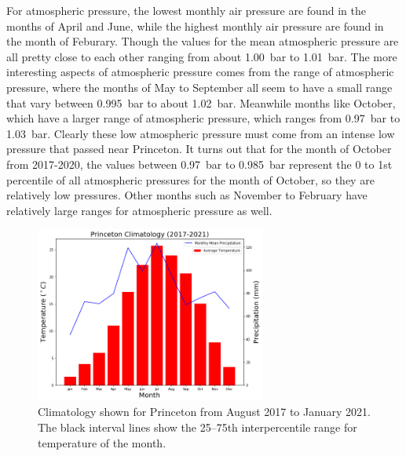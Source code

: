 \documentclass[11pt]{report}
\begin{document}
For atmospheric pressure, the lowest monthly air pressure are found in the
months of April and June, while the highest monthly air pressure are found
in the month of Feburary. Though the values for the mean atmospheric
pressure are all pretty close to each other ranging from about 1.00~bar to
1.01~bar. The more interesting aspects of atmospheric pressure comes from
the range of atmospheric pressure, where the months of May to September all
seem to have a small range that vary between 0.995~bar to about
1.02~bar. Meanwhile months like October, which have a larger range
of atmospheric pressure, which ranges from 0.97~bar to 1.03~bar. Clearly
these low atmospheric pressure must come from an intense low pressure that
passed near Princeton. It turns out that for the month of October from
2017-2020, the values between 0.97~bar to 0.985~bar represent
the 0 to 1st percentile of all atmospheric pressures for the month of
October, so they are relatively low pressures. Other months such as November
to February have relatively large ranges for atmospheric pressure as well.
\clearpage
\begin{figure}[b]
	\centering
	\includegraphics[width=0.675\textwidth]{Figures/Climate1.png}
	\caption[Climatology of temperature and precipitation of Princeton
          (2017--2021)]{\label{Clim1} Climatology shown for Princeton from
          August 2017 to January 2021. The black interval lines show the
          25--75th interpercentile range for temperature of the month.}
\end{figure}
\end{document}

